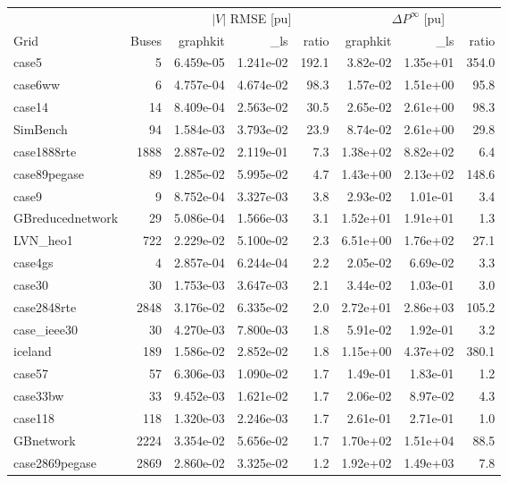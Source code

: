 \documentclass[10pt]{article}
\begin{document}
\begin{table}[H]
\centering\scriptsize
\begin{tabular}{lrrrrrrr}
\toprule
 & & \multicolumn{3}{c}{$|V|$ RMSE [pu]} & \multicolumn{3}{c}{$\Delta P^{\infty}$ [pu]} \\
\cmidrule(lr){3-5}\cmidrule(lr){6-8}
Grid & Buses & graphkit & \_ls & ratio & graphkit & \_ls & ratio \\
\midrule
case5 & 5 & 6.459e-05 & 1.241e-02 & 192.1 & 3.82e-02 & 1.35e+01 & 354.0 \\
case6ww & 6 & 4.757e-04 & 4.674e-02 & 98.3 & 1.57e-02 & 1.51e+00 & 95.8 \\
case14 & 14 & 8.409e-04 & 2.563e-02 & 30.5 & 2.65e-02 & 2.61e+00 & 98.3 \\
SimBench & 94 & 1.584e-03 & 3.793e-02 & 23.9 & 8.74e-02 & 2.61e+00 & 29.8 \\
case1888rte & 1888 & 2.887e-02 & 2.119e-01 & 7.3 & 1.38e+02 & 8.82e+02 & 6.4 \\
case89pegase & 89 & 1.285e-02 & 5.995e-02 & 4.7 & 1.43e+00 & 2.13e+02 & 148.6 \\
case9 & 9 & 8.752e-04 & 3.327e-03 & 3.8 & 2.93e-02 & 1.01e-01 & 3.4 \\
GBreducednetwork & 29 & 5.086e-04 & 1.566e-03 & 3.1 & 1.52e+01 & 1.91e+01 & 1.3 \\
LVN\_heo1 & 722 & 2.229e-02 & 5.100e-02 & 2.3 & 6.51e+00 & 1.76e+02 & 27.1 \\
case4gs & 4 & 2.857e-04 & 6.244e-04 & 2.2 & 2.05e-02 & 6.69e-02 & 3.3 \\
case30 & 30 & 1.753e-03 & 3.647e-03 & 2.1 & 3.44e-02 & 1.03e-01 & 3.0 \\
case2848rte & 2848 & 3.176e-02 & 6.335e-02 & 2.0 & 2.72e+01 & 2.86e+03 & 105.2 \\
case\_ieee30 & 30 & 4.270e-03 & 7.800e-03 & 1.8 & 5.91e-02 & 1.92e-01 & 3.2 \\
iceland & 189 & 1.586e-02 & 2.852e-02 & 1.8 & 1.15e+00 & 4.37e+02 & 380.1 \\
case57 & 57 & 6.306e-03 & 1.090e-02 & 1.7 & 1.49e-01 & 1.83e-01 & 1.2 \\
case33bw & 33 & 9.452e-03 & 1.621e-02 & 1.7 & 2.06e-02 & 8.97e-02 & 4.3 \\
case118 & 118 & 1.320e-03 & 2.246e-03 & 1.7 & 2.61e-01 & 2.71e-01 & 1.0 \\
GBnetwork & 2224 & 3.354e-02 & 5.656e-02 & 1.7 & 1.70e+02 & 1.51e+04 & 88.5 \\
case2869pegase & 2869 & 2.860e-02 & 3.325e-02 & 1.2 & 1.92e+02 & 1.49e+03 & 7.8 \\

\end{tabular}
\end{table}
\end{document}
